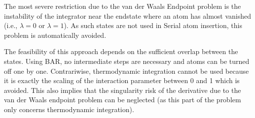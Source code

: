 The most severe restriction due to the van der Waals Endpoint
problem is the instability of the integrator near the endstate where an atom has almost vanished (i.e.,  $\lambda=0$ or  $\lambda=1$). As such states
are not used in Serial atom insertion, this problem is automatically
avoided.

The feasibility of this approach depends on the sufficient overlap
between the states. Using BAR, no intermediate steps are necessary
and atoms can be turned off one by one. Contrariwise, thermodynamic
integration cannot be used because it is exactly the scaling of the
interaction parameter between 0 and 1 which is avoided. This also
implies that the singularity risk of the derivative due to the van
der Waals endpoint problem can be neglected (as this part of the problem
only concerns thermodynamic integration).
